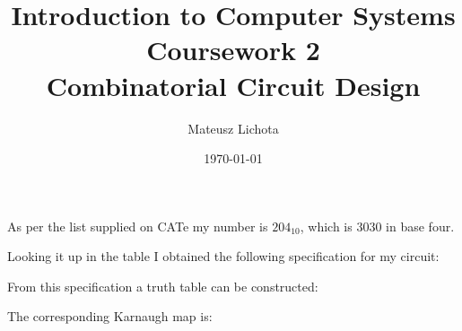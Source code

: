 \documentclass[12pt]{article}
\begin{document}
\title{\large \textbf{Introduction to Computer Systems Coursework 2 \\ 
\vspace{0.5em}
\large Combinatorial Circuit Design}}


\author{Mateusz Lichota}
\date{\today}
\maketitle

As per the list supplied on CATe my number is $204_{10}$, which is $3030$ in base four.

Looking it up in the table I obtained the following specification for my circuit:


From this specification a truth table can be constructed:


The corresponding Karnaugh map is:



\end{document}
